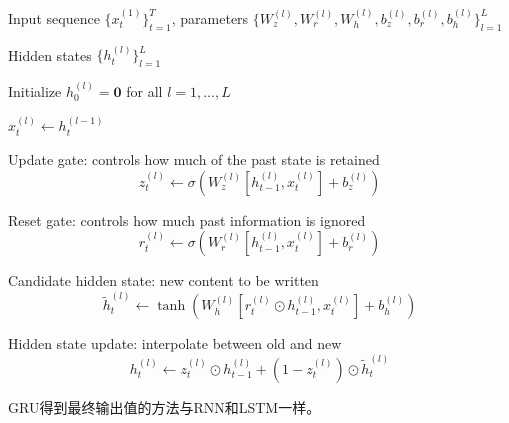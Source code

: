 \begin{algorithm}[H]
	\caption{Forward Propagation of a Multi-layer GRU}
	\label{alg:stacked_gru_forward}
	\begin{algorithmic}[1]
		
		\Require Input sequence $\{x_t^{(1)}\}_{t=1}^T$, 
		parameters $\{W_z^{(l)},W_r^{(l)},W_h^{(l)},b_z^{(l)},b_r^{(l)},b_h^{(l)}\}_{l=1}^{L}$
		
		\Ensure Hidden states $\{h_t^{(l)}\}_{l=1}^{L}$
		
		\State Initialize $h_0^{(l)}=\mathbf{0}$ for all $l=1,\dots,L$
		
		 
		
		 
		
		\State $x_t^{(l)} \gets h_t^{(l-1)}$ 
		\EndIf
		
		\State Update gate: controls how much of the past state is retained
		\begin{equation*}
			z_t^{(l)} \gets \sigma\!\left(W_z^{(l)}[h_{t-1}^{(l)},x_t^{(l)}]+b_z^{(l)}\right)
		\end{equation*}
		
		\State Reset gate: controls how much past information is ignored
		\begin{equation*}
			r_t^{(l)} \gets \sigma\!\left(W_r^{(l)}[h_{t-1}^{(l)},x_t^{(l)}]+b_r^{(l)}\right)
		\end{equation*}
		
		\State Candidate hidden state: new content to be written
		\begin{equation*}
			\tilde h_t^{(l)} \gets \tanh\!\left(W_h^{(l)}[r_t^{(l)}\odot h_{t-1}^{(l)},x_t^{(l)}]+b_h^{(l)}\right)
		\end{equation*}
		
		\State Hidden state update: interpolate between old and new
		\begin{equation*}
			h_t^{(l)} \gets z_t^{(l)}\odot h_{t-1}^{(l)} + (1-z_t^{(l)})\odot \tilde h_t^{(l)}
		\end{equation*}
		\EndFor
		\EndFor
	\end{algorithmic}
\end{algorithm}
GRU得到最终输出值的方法与RNN和LSTM一样。
